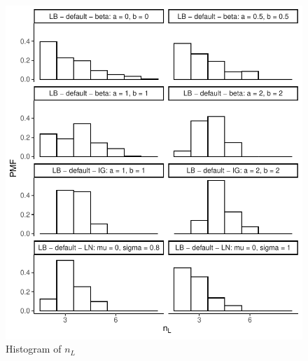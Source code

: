 \documentclass{amsart}
\begin{document}
\begin{figure}[ht]
	\centering
	\includegraphics[width=0.95\linewidth]{hist_nl_4.pdf}
	\caption{Histogram of $n_L$}
	\label{fig:hist:nl:4}
\end{figure}
\end{document}

